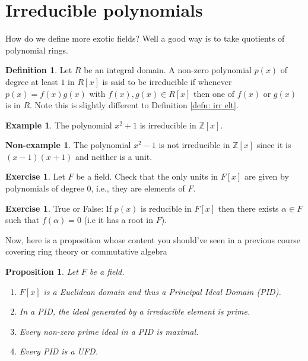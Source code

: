 \documentclass[11pt,a4paper]{report}
\theoremstyle{plain}
\newtheorem{prop}[subsection]{Proposition}
\theoremstyle{definition}
\newtheorem{defn}[subsection]{Definition}
\newtheorem{exmp}[subsection]{Example}
\newtheorem{nexmp}[subsection]{Non-example}
\theoremstyle{definition}
\newtheorem{question}[subsection]{Exercise}
\newcommand{\ZZ}{\mathbb{Z}}
\def\QQ{\mathbb{Q}}
\def \a{\alpha}
\begin{document}
	
	\section{Irreducible polynomials}
	How do we define more exotic fields? Well a good way is to take quotients of polynomial rings.
	
	
	\begin{defn}
		Let $R$ be an integral domain.	A non-zero polynomial $p(x)$ of degree at least $1$ in $R[x]$ is said to be irreducible if whenever $p(x)=f(x)g(x)$ with $f(x),g(x) \in R[x]$ then one of $f(x)$ or $g(x)$ is in $R$. Note this is slightly different to Definition \ref{defn: irr elt}.  
	\end{defn}
	
	\begin{exmp}
		The polynomial $x^2+1$ is irreducible  in $\ZZ[x]$.
		
	\end{exmp}
	
	\begin{nexmp}
		The polynomial $x^2-1$ is not irreducible in $\ZZ[x]$ since it is $(x-1)(x+1)$ and neither is a unit.
	\end{nexmp}
	
	\begin{question}\label{Q1}
		Let $F$ be a field.	Check that the only units in $F[x]$ are given by polynomials of degree $0$, i.e., they are elements of $F$.
	\end{question}
	
	\begin{question}
		True or False:	If $p(x)$ is reducible in $F[x]$ then there exists $\a \in F$ such that $f(\a)=0$ (i.e it has a root in $F$). %
	\end{question}
	Now, here is a proposition whose content you should've seen in a previous course covering ring theory or commutative algebra
	
	\begin{prop} \label{prop: background ring theory} Let $F$ be a field.
		\begin{enumerate}
			\item $F[x]$ is a Euclidean domain and thus a Principal Ideal Domain (PID).
			\item In a PID, the ideal generated by a irreducible element is prime.
			\item Every non-zero prime ideal in a PID is maximal.
			\item Every PID is a UFD.	
		\end{enumerate}
		
	\end{prop}
	
\end{document}
